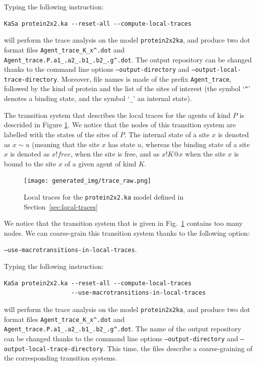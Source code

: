 \documentclass[11pt]{book}
\def\ttt#1{\texttt{#1}}
\begin{document}
Typing the following instruction:

\begin{verbatim}
KaSa protein2x2.ka --reset-all --compute-local-traces
\end{verbatim}

will perform the trace analysis on the model \texttt{protein2x2ka}, and produce
two dot format files \texttt{Agent\_trace\_K\_x\string^.dot} and \texttt{Agent\_trace.P.a1\_.a2\_.b1\_.b2\_.g\string^.dot}. The  output repository can be changed thanks to the command line options \texttt{--output-directory} and \texttt{--output-local-trace-directory}. Moreover, file names is made of the prefix \texttt{Agent\_trace}, followed by  the kind of protein and the list of the sites of interest (the symbol `\texttt{\string^}' denotes a binding state, and the symbol `\texttt{\_}' an internal state).

The transition system that describes the local traces for the agents of kind $P$ is descrided in Figure \ref{fig:trace-raw}. We notice that the nodes of this transition system are labelled with the states of the sites of $P$. The internal state of a site $x$ is denoted as $x{\sim}u$ (meaning that the site $x$ has state $u$, whereas the binding state of a site $x$ is denoted as $x!\textit{free}$, when the site is free, and as $x!K@x$ when the site $x$ is bound to the site $x$ of a given agent of kind $K$.

\begin{figure}[htbp]
\centering
\texttt{[image: generated\_img/trace\_raw.png]}
\caption{Local traces for the \ttt{protein2x2.ka} model defined in Section~\ref{sec:local-traces}}
\label{fig:trace-raw}
\end{figure}

We notice that the transition system that is given in Fig.~\ref{fig:trace-raw}  contains too many nodes. We can coarse-grain this transition system thanks to the following option:
\begin{center}
\texttt{--use-macrotransitions-in-local-traces}.
\end{center}
Typing the following instruction:

\begin{verbatim}
KaSa protein2x2.ka --reset-all --compute-local-traces
                   --use-macrotransitions-in-local-traces
\end{verbatim}

will perform the trace analysis on the model \texttt{protein2x2ka}, and produce
two dot format files \texttt{Agent\_trace\_K\_x\string^.dot} and \texttt{Agent\_trace.P.a1\_.a2\_.b1\_.b2\_.g\string^.dot}. The name of the output repository can be changed thanks to the command line options \texttt{--output-directory} and \texttt{--output-local-trace-directory}.
This time, the files describe a coarse-graining of the corresponding transition systems.
\end{document}
